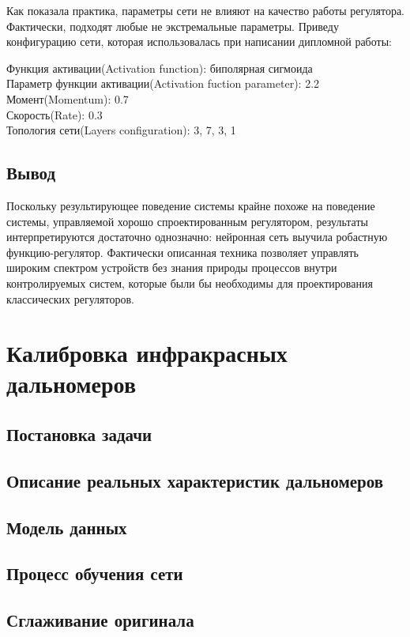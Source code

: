 \documentclass[14pt]{extreport}
\begin{document}
            Как показала практика, параметры сети не влияют на качество работы регулятора. Фактически, подходят любые не экстремальные параметры. Приведу конфигурацию сети, которая использовалась при написании дипломной работы:
                \begin{center}
                  Функция активации(Activation function): биполярная сигмоида\\
                  Параметр функции активации(Activation fuction parameter): 2.2\\
                  Момент(Momentum): 0.7\\
                  Скорость(Rate): 0.3\\
                  Топология сети(Layers configuration): 3, 7, 3, 1
                \end{center}
        \section{Вывод}
            Поскольку результирующее поведение системы крайне похоже на поведение системы, управляемой хорошо спроектированным регулятором, результаты интерпретируются достаточно однозначно: нейронная сеть выучила робастную функцию-регулятор. Фактически описанная техника позволяет управлять широким спектром устройств без знания природы процессов внутри контролируемых систем, которые были бы необходимы для проектирования классических регуляторов. 
    \chapter{Калибровка инфракрасных дальномеров}
        \section{Постановка задачи}
        \section{Описание реальных характеристик дальномеров}
        \section{Модель данных}
        \section{Процесс обучения сети}
        \section{Сглаживание оригинала}
\end{document}
